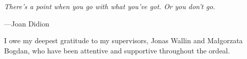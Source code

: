 \documentclass{book}
\begin{document}

\pagestyle{empty}




\newpage
\thispagestyle{empty} %

\setlength\epigraphrule{0pt}
\setlength{}

\null
\vspace{20ex}



\epigraph{\itshape
  There’s a point when you go with what you’ve got. Or you don’t go.
}{
  ---Joan Didion
}






\cleardoublepage

\pagestyle{headings}

\setcounter{page}{1} %
\setcounter{tocdepth}{1}

\tableofcontents
{}


\newpage


I owe my deepest gratitude to my supervisors, Jonas Wallin and Małgorzata Bogdan, who have been attentive and supportive throughout the ordeal.
\end{document}
